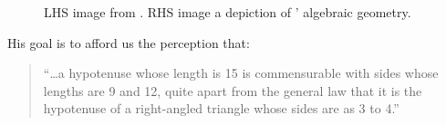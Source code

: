 \documentclass[a4paper, 12pt]{article}
\begin{document}


\begin{figure}[ht!]
    \centering
    \caption{LHS image from \citet[p.~69]{descartes_philosophical_1911}. RHS image a depiction of \citeauthor{descartes_philosophical_1911}' algebraic geometry.}
    \label{fig:triangles:theorems}
\end{figure}


His goal is to afford us the perception that: 

\begin{quotation}
    ``\dots a hypotenuse whose length is 15 is commensurable with sides whose lengths are 9 and 12, quite apart from the general law that it is the hypotenuse of a right-angled triangle whose sides are as 3 to 4.'' \citep[Rule~XVI, p.~69]{descartes_philosophical_1911}
\end{quotation}
\end{document}
